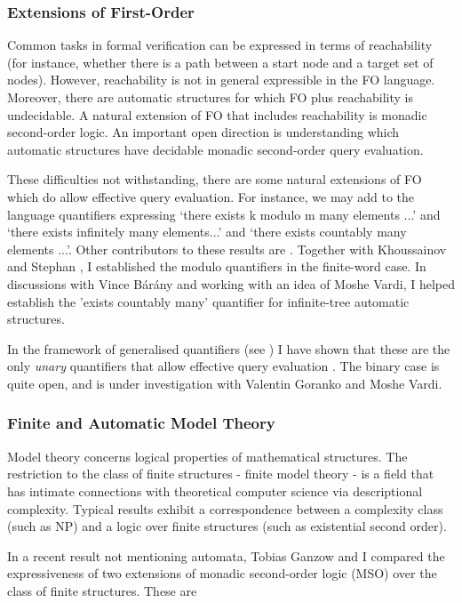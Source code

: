 \documentclass[11pt]{article}
\theoremstyle{plain} \numberwithin{equation}{section}
\theoremstyle{definition}
\begin{document}
\subsubsection*{Extensions of First-Order}\noindent  Common tasks in formal verification can be expressed in terms of reachability (for instance, whether there is a path between a start node and a target set of nodes). However, reachability is not in general expressible in the FO language. Moreover, there are automatic structures for which FO plus reachability is undecidable. A natural extension of FO that includes reachability is monadic second-order logic. An important open direction is understanding which automatic structures have decidable monadic second-order query evaluation.

These difficulties not withstanding, there are some natural extensions of FO which do allow effective query evaluation. For instance, we may add to the language quantifiers expressing `there exists k modulo m many elements ...' and `there exists infinitely many elements...' and `there exists countably many elements ...'. Other contributors to these results are \cite{Blum99, Colc04, KuLo05}. Together with Khoussainov and Stephan \cite{KRS04}, I established the modulo quantifiers in the finite-word case. In discussions with Vince B{\'a}r{\'a}ny \cite{BKra} and working with an idea of Moshe Vardi, I helped establish the 'exists countably many' quantifier for infinite-tree automatic structures.

In the framework of generalised quantifiers (see \cite{Hell89}) I have shown that these are the only {\em unary} quantifiers that allow effective query evaluation \cite{Rubi08}. The binary case is quite open, and is under investigation with Valentin Goranko and Moshe Vardi.


\subsubsection*{Finite and Automatic Model Theory}\noindent   Model theory concerns logical properties of mathematical structures. The restriction to the class of finite structures -  finite model theory -  is a field that has intimate connections with theoretical computer science via descriptional complexity. Typical results exhibit a correspondence between a complexity class (such as NP) and a logic over finite structures (such as existential second order).

In a recent result not mentioning automata, Tobias Ganzow and I compared the expressiveness of two extensions of monadic second-order logic (MSO) over the class of finite structures. These are
\end{document}
